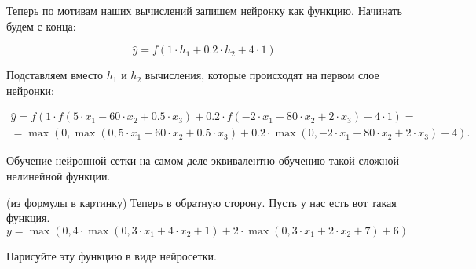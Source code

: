\documentclass[12pt, a4paper, oneside]{article}
\theoremstyle{plain} %
\theoremstyle{definition}
\begin{document}
\begin{sol}
Теперь по мотивам наших вычислений запишем нейронку как функцию. Начинать будем с конца:

$$
\hat y = f(1 \cdot h_1 + 0.2 \cdot h_2 + 4 \cdot 1)
$$

Подставляем вместо $h_1$ и $h_2$ вычисления, которые происходят на первом слое нейронки: 

\begin{multline*}
\hat y = f(1 \cdot f(5 \cdot x_1 -60 \cdot x_2 + 0.5 \cdot x_3) + 0.2 \cdot f(-2 \cdot x_1 -80 \cdot x_2 + 2 \cdot x_3) + 4 \cdot 1) = \\ = \max(0, \max(0, 5 \cdot x_1 -60 \cdot x_2 + 0.5 \cdot x_3) + 0.2 \cdot \max(0, -2 \cdot x_1 -80 \cdot x_2 + 2 \cdot x_3) + 4).
\end{multline*}

Обучение нейронной сетки на самом деле эквивалентно обучению такой сложной нелинейной функции. 
\end{sol}


\begin{problem}{(из формулы в картинку)}
Теперь в обратную сторону. Пусть у нас есть вот такая функция. 
\[
y = \max(0, 4 \cdot \max(0, 3 \cdot x_1 + 4 \cdot x_2 + 1) + 2 \cdot \max(0, 3 \cdot x_1 + 2 \cdot x_2 + 7) + 6)
\]

Нарисуйте эту функцию в виде нейросетки.
\end{problem}
\end{document}
